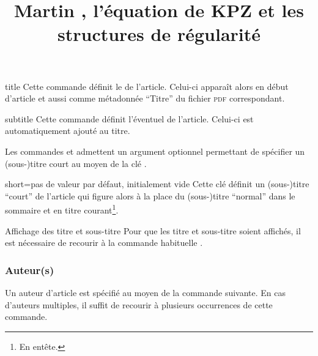 \begin{docCommand}[doc description=\mandatory]{title}{}
  Cette commande définit le  de l'article. Celui-ci apparaît alors
  en début d'article et aussi comme métadonnée \enquote{Titre} du fichier
  \textsc{pdf} correspondant.
\end{docCommand}

\begin{docCommand}{subtitle}{}
  Cette commande définit l'éventuel  de l'article. Celui-ci
  est automatiquement ajouté au titre.
\end{docCommand}

Les commandes  et  admettent un argument
optionnel permettant de spécifier un (sous-)titre court au moyen de la clé
.

\begin{docKey}{short}{=}{pas de valeur par défaut,
    initialement vide}
  Cette clé définit un (sous-)titre \enquote{court} de l'article qui figure
  alors à la place du (sous-)titre \enquote{normal} dans le sommaire et en titre
  courant\footnote{En entête.}.
\end{docKey}

\begin{bodycode}
\title[short=Les travaux de Martin \surname{Hairer}]{Martin ,
  l'équation de KPZ et les structures de régularité}
\end{bodycode}

\begin{dbremark}{Affichage des titre et sous-titre}{}
  Pour que les titre et sous-titre soient affichés, il est nécessaire de
  recourir à la commande habituelle .
\end{dbremark}

\subsubsection{Auteur(s)}
\label{sec-auteurs}

Un auteur d'article est spécifié au moyen de la commande 
suivante. En cas d'auteurs multiples, il  suffit de recourir à plusieurs
occurrences de cette commande.

